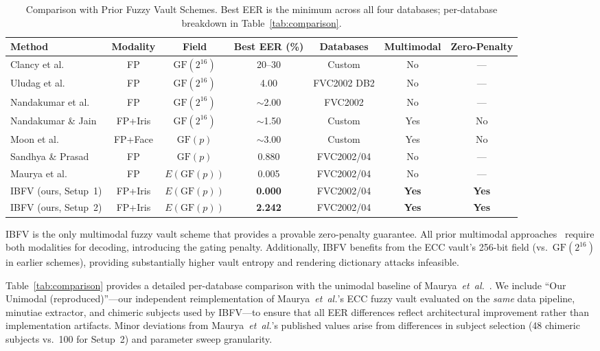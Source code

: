 \documentclass[conference]{IEEEtran}
\newcommand{\IBFV}{\textsf{IBFV}}
\newcommand{\GFp}{\mathrm{GF}(p)}
\begin{document}
\begin{table}[t]
\centering
\caption{Comparison with Prior Fuzzy Vault Schemes. Best EER is the minimum across all four databases; per-database breakdown in Table~\ref{tab:comparison}.}
\label{tab:comparison_extended}
\begin{tabular}{@{}l c c c c c c@{}}
\toprule
\textbf{Method} & \textbf{Modality} & \textbf{Field} & \textbf{Best EER (\%)} & \textbf{Databases} & \textbf{Multimodal} & \textbf{Zero-Penalty} \\
\midrule
Clancy et al.~\cite{clancy2003secure} & FP & $\text{GF}(2^{16})$ & 20--30 & Custom & No & --- \\
Uludag et al.~\cite{uludag2005fuzzy} & FP & $\text{GF}(2^{16})$ & 4.00 & FVC2002 DB2 & No & --- \\
Nandakumar et al.~\cite{nandakumar2007fuzzy} & FP & $\text{GF}(2^{16})$ & $\sim$2.00 & FVC2002 & No & --- \\
Nandakumar \& Jain~\cite{nandakumar2008multibiometric} & FP+Iris & $\text{GF}(2^{16})$ & $\sim$1.50 & Custom & Yes & No \\
Moon et al.~\cite{moon2010multibiometric} & FP+Face & $\text{GF}(p)$ & $\sim$3.00 & Custom & Yes & No \\
Sandhya \& Prasad~\cite{sandhya2017fingerprint} & FP & $\text{GF}(p)$ & 0.880 & FVC2002/04 & No & --- \\
Maurya et al.~\cite{maurya2025enhancing} & FP & $E(\GFp{})$ & 0.005 & FVC2002/04 & No & --- \\
\midrule
\IBFV{} (ours, Setup~1) & FP+Iris & $E(\GFp{})$ & \textbf{0.000} & FVC2002/04 & \textbf{Yes} & \textbf{Yes} \\
\IBFV{} (ours, Setup~2) & FP+Iris & $E(\GFp{})$ & \textbf{2.242} & FVC2002/04 & \textbf{Yes} & \textbf{Yes} \\
\bottomrule
\end{tabular}
\end{table}

\IBFV{} is the only multimodal fuzzy vault scheme that provides a provable zero-penalty guarantee. All prior multimodal approaches~\cite{nandakumar2008multibiometric,moon2010multibiometric} require both modalities for decoding, introducing the gating penalty. Additionally, \IBFV{} benefits from the ECC vault's 256-bit field (vs.\ $\text{GF}(2^{16})$ in earlier schemes), providing substantially higher vault entropy and rendering dictionary attacks infeasible.

Table~\ref{tab:comparison} provides a detailed per-database comparison with the unimodal baseline of Maurya~\textit{et~al.}~\cite{maurya2025enhancing}. We include ``Our Unimodal (reproduced)''---our independent reimplementation of Maurya~\textit{et~al.}'s ECC fuzzy vault evaluated on the \emph{same} data pipeline, minutiae extractor, and chimeric subjects used by \IBFV{}---to ensure that all EER differences reflect architectural improvement rather than implementation artifacts. Minor deviations from Maurya~\textit{et~al.}'s published values arise from differences in subject selection (48 chimeric subjects vs.\ 100 for Setup~2) and parameter sweep granularity.
\end{document}
